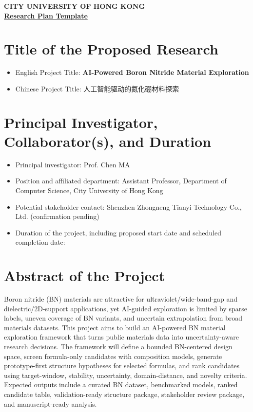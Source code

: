 \documentclass[10pt,a4paper]{article}
\newcommand{\blank}[1][7em]{\colorbox{yellow!35}{\rule{0pt}{1.05em}\hspace{#1}}}
\begin{document}
\vspace*{-34pt}
\begin{center}
    \textbf{CITY UNIVERSITY OF HONG KONG}\\
    \vspace{6pt}
    \underline{\textbf{Research Plan Template}}
\end{center}

\section{Title of the Proposed Research}
\begin{itemize}[leftmargin=15pt]
    \item English Project Title: \textbf{AI-Powered Boron Nitride Material Exploration}
    \item Chinese Project Title: 人工智能驱动的氮化硼材料探索
\end{itemize}

\section{Principal Investigator, Collaborator(s), and Duration}
\begin{itemize}[leftmargin=15pt]
    \item Principal investigator: Prof. Chen MA
    \item Position and affiliated department: Assistant Professor, Department of Computer Science, City University of Hong Kong
    \item Potential stakeholder contact: Shenzhen Zhongneng Tianyi Technology Co., Ltd. (confirmation pending)
    \item Duration of the project, including proposed start date and scheduled completion date:\\[-1pt]\blank[18em]
\end{itemize}

\section{Abstract of the Project}
Boron nitride (BN) materials are attractive for ultraviolet/wide-band-gap and dielectric/2D-support applications, yet AI-guided exploration is limited by sparse labels, uneven coverage of BN variants, and uncertain extrapolation from broad materials datasets. This project aims to build an AI-powered BN material exploration framework that turns public materials data into uncertainty-aware research decisions. The framework will define a bounded BN-centered design space, screen formula-only candidates with composition models, generate prototype-first structure hypotheses for selected formulas, and rank candidates using target-window, stability, uncertainty, domain-distance, and novelty criteria. Expected outputs include a curated BN dataset, benchmarked models, ranked candidate table, validation-ready structure package, stakeholder review package, and manuscript-ready analysis.
\end{document}
